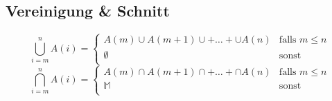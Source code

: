 \documentclass[12pt,a4paper]{article}
\begin{document}
\subsection{Vereinigung \& Schnitt}
$$\bigcup\limits_{i=m}^n A(i) = \left\lbrace \begin{array}{ll}
		A(m) \cup A(m + 1) \cup + \dots + \cup A(n) & \textrm{falls } m \leq n \\
		\emptyset                                   & \textrm{sonst}           \\
	\end{array}  \right.$$
$$\bigcap\limits_{i=m}^n A(i) = \left\lbrace \begin{array}{ll}
		A(m) \cap A(m + 1) \cap + \dots + \cap A(n) & \textrm{falls } m \leq n \\
		\mathbb{M}                                  & \textrm{sonst}           \\
	\end{array}  \right.$$
\end{document}
